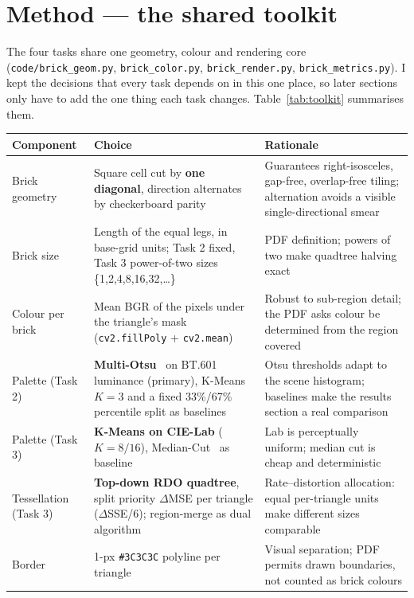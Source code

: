 \documentclass[11pt,a4paper]{article}
\begin{document}
\section{Method --- the shared toolkit}

The four tasks share one geometry, colour and rendering core
(\texttt{code/brick\_geom.py}, \texttt{brick\_color.py},
\texttt{brick\_render.py}, \texttt{brick\_metrics.py}). I kept the decisions
that every task depends on in this one place, so later sections only have to
add the one thing each task changes. Table~\ref{tab:toolkit} summarises them.

\begin{table}[htbp]
\centering
\footnotesize
\begin{tabularx}{\textwidth}{@{}p{2.6cm}Y Y@{}}
\toprule
\textbf{Component} & \textbf{Choice} & \textbf{Rationale}\\
\midrule
Brick geometry
  & Square cell cut by \textbf{one diagonal}, direction alternates by checkerboard parity
  & Guarantees right-isosceles, gap-free, overlap-free tiling; alternation avoids a visible single-directional smear\\
Brick size
  & Length of the equal legs, in base-grid units; Task 2 fixed, Task 3 power-of-two sizes \{1,2,4,8,16,32,\ldots\}
  & PDF definition; powers of two make quadtree halving exact\\
Colour per brick
  & Mean BGR of the pixels under the triangle's mask (\texttt{cv2.fillPoly} + \texttt{cv2.mean})
  & Robust to sub-region detail; the PDF asks colour be determined from the region covered\\
Palette (Task 2)
  & \textbf{Multi-Otsu}~\cite{otsu1979} on BT.601 luminance (primary), K-Means~\cite{lloyd1982} $K=3$ and a fixed 33\%/67\% percentile split as baselines
  & Otsu thresholds adapt to the scene histogram; baselines make the results section a real comparison\\
Palette (Task 3)
  & \textbf{K-Means on CIE-Lab} ($K=8/16$), Median-Cut~\cite{heckbert1982} as baseline
  & Lab is perceptually uniform; median cut is cheap and deterministic\\
Tessellation (Task 3)
  & \textbf{Top-down RDO quadtree}, split priority $\Delta$MSE per triangle ($\Delta$SSE/6); region-merge as dual algorithm
  & Rate--distortion allocation: equal per-triangle units make different sizes comparable\\
Border
  & 1-px \texttt{\#3C3C3C} polyline per triangle
  & Visual separation; PDF permits drawn boundaries, not counted as brick colours\\

\end{tabularx}
\end{table}
\end{document}
